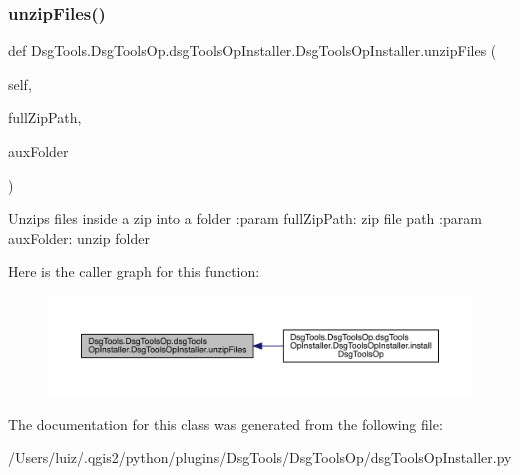 \subsubsection{\texorpdfstring{unzip\+Files()}{unzipFiles()}}
{\footnotesize\ttfamily def Dsg\+Tools.\+Dsg\+Tools\+Op.\+dsg\+Tools\+Op\+Installer.\+Dsg\+Tools\+Op\+Installer.\+unzip\+Files (\begin{DoxyParamCaption}\item[{}]{self,  }\item[{}]{full\+Zip\+Path,  }\item[{}]{aux\+Folder }\end{DoxyParamCaption})}

\begin{DoxyVerb}Unzips files inside a zip into a folder
:param fullZipPath: zip file path
:param auxFolder: unzip folder
\end{DoxyVerb}
 Here is the caller graph for this function\+:
\nopagebreak
\begin{figure}[H]
\begin{center}
\leavevmode
\includegraphics[width=350pt]{class_dsg_tools_1_1_dsg_tools_op_1_1dsg_tools_op_installer_1_1_dsg_tools_op_installer_a8650989789a77d928a1fee122e82d45c_icgraph}
\end{center}
\end{figure}


The documentation for this class was generated from the following file\+:\begin{DoxyCompactItemize}
\item 
/\+Users/luiz/.\+qgis2/python/plugins/\+Dsg\+Tools/\+Dsg\+Tools\+Op/dsg\+Tools\+Op\+Installer.\+py\end{DoxyCompactItemize}
